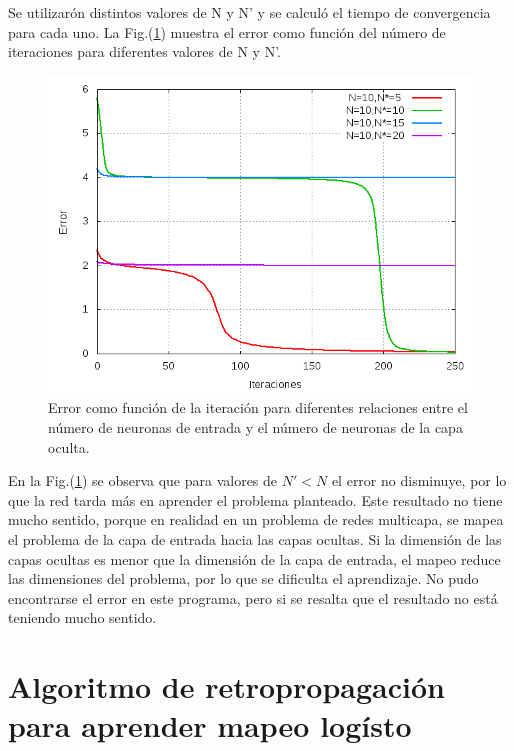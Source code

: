 \documentclass[aps,prb,onecolumn,10pt,floatfix,superscriptaddress]{article} %
\begin{document}
Se utilizar\'on distintos valores de N y N' y se calcul\'o el tiempo de convergencia para cada uno. La Fig.(\ref{error3}) muestra el error como funci\'on del n\'umero de iteraciones para diferentes valores de N y N'.

\begin{figure}[!htd]
\begin{center}
 \includegraphics[scale=0.35]{xor3.png}
  \caption{\label{error3} Error como funci\'on de la iteraci\'on para diferentes relaciones entre el n\'umero de neuronas de entrada y el n\'umero de neuronas de la capa oculta.}
  \end{center}
 \end{figure}

En la Fig.(\ref{error3}) se observa que para valores de $N' < N$ el error no disminuye, por lo que la red tarda m\'as en aprender el problema planteado. Este resultado no tiene mucho sentido, porque en realidad en un problema de redes multicapa, se mapea el problema de la capa de entrada hacia las capas ocultas. Si la dimensi\'on de las capas ocultas es menor que la dimensi\'on de la capa de entrada, el mapeo reduce las dimensiones del problema, por lo que se dificulta el aprendizaje. No pudo encontrarse el error en este programa, pero si se resalta que el resultado no est\'a teniendo mucho sentido.

\section{Algoritmo de retropropagaci\'on para aprender mapeo log\'isto}
\end{document}

